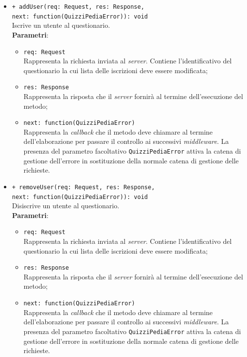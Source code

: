 \begin{itemize}
\begin{itemize}
		\item \texttt{+ addUser(req: Request, res: Response, \\next: function(QuizziPediaError)): void}\\
		Iscrive un utente al questionario.\\
		\textbf{Parametri}:
		\begin{itemize}
			\item \texttt{req: Request}\\
			Rappresenta la richiesta inviata al \textit{server}. Contiene l'identificativo del questionario la cui lista delle iscrizioni deve essere modificata;
			\item \texttt{res: Response}\\
			Rappresenta la risposta che il \textit{server} fornirà al termine dell'esecuzione del metodo;
			\item \texttt{next: function(QuizziPediaError)}\\
			Rappresenta la \textit{callback} che il metodo deve chiamare al termine dell'elaborazione per passare il controllo ai successivi \textit{middleware}. La presenza del parametro facoltativo \texttt{QuizziPediaError} attiva la catena di gestione dell'errore in sostituzione della normale catena di gestione delle richieste.
		\end{itemize}
		\item \texttt{+ removeUser(req: Request, res: Response, \\next: function(QuizziPediaError)): void}\\
		Disiscrive un utente al questionario.\\
		\textbf{Parametri}:
		\begin{itemize}
			\item \texttt{req: Request}\\
			Rappresenta la richiesta inviata al \textit{server}. Contiene l'identificativo del questionario la cui lista delle iscrizioni deve essere modificata;
			\item \texttt{res: Response}\\
			Rappresenta la risposta che il \textit{server} fornirà al termine dell'esecuzione del metodo;
			\item \texttt{next: function(QuizziPediaError)}\\
			Rappresenta la \textit{callback} che il metodo deve chiamare al termine dell'elaborazione per passare il controllo ai successivi \textit{middleware}. La presenza del parametro facoltativo \texttt{QuizziPediaError} attiva la catena di gestione dell'errore in sostituzione della normale catena di gestione delle richieste.
		\end{itemize}
		

\end{itemize}
\end{itemize}
